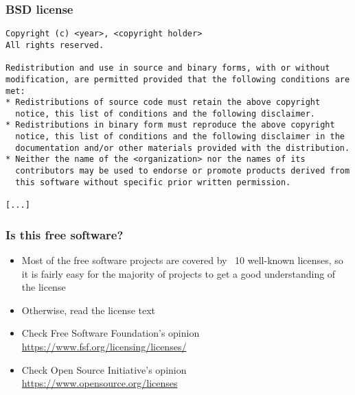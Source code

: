 \begin{frame}[fragile]
  \frametitle{BSD license}
  \begin{block}{}
  \small
  \begin{verbatim}
Copyright (c) <year>, <copyright holder>
All rights reserved.

Redistribution and use in source and binary forms, with or without
modification, are permitted provided that the following conditions are
met:
* Redistributions of source code must retain the above copyright
  notice, this list of conditions and the following disclaimer.
* Redistributions in binary form must reproduce the above copyright
  notice, this list of conditions and the following disclaimer in the
  documentation and/or other materials provided with the distribution.
* Neither the name of the <organization> nor the names of its
  contributors may be used to endorse or promote products derived from
  this software without specific prior written permission.

[...]
\end{verbatim}
  \end{block}
\end{frame}

\begin{frame}
  \frametitle{Is this free software?}
  \begin{itemize}
  \item Most of the free software projects are covered by ~10
    well-known licenses, so it is fairly easy for the majority of
    projects to get a good understanding of the license
  \item Otherwise, read the license text
  \item Check Free Software Foundation's opinion\\
    \url{https://www.fsf.org/licensing/licenses/}
  \item Check Open Source Initiative's opinion\\
    \url{https://www.opensource.org/licenses}
  \end{itemize}
\end{frame}

